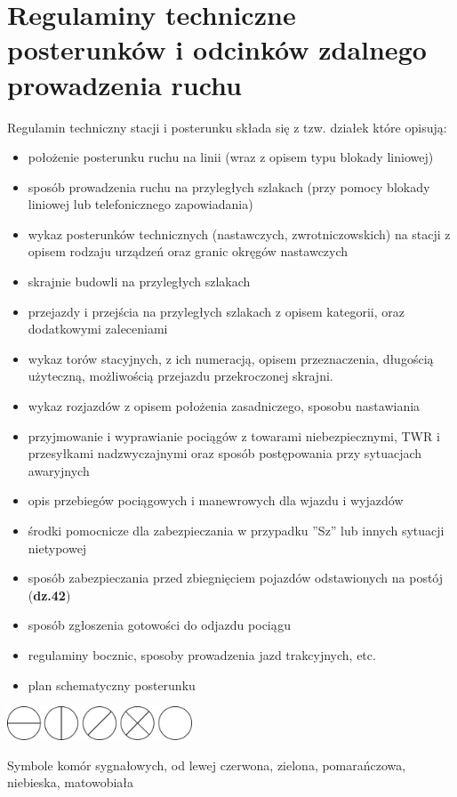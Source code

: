 \chapter{Regulaminy techniczne posterunków i odcinków zdalnego prowadzenia ruchu}

Regulamin techniczny stacji i posterunku składa się z tzw. działek które opisują:
\begin{itemize}
	\item położenie posterunku ruchu na linii (wraz z opisem typu blokady liniowej)
	\item sposób prowadzenia ruchu na przyległych szlakach (przy pomocy blokady liniowej lub telefonicznego zapowiadania)
	\item wykaz posterunków technicznych (nastawczych, zwrotniczowskich) na stacji z opisem rodzaju urządzeń oraz granic okręgów nastawczych
	\item skrajnie budowli na przyległych szlakach
	\item przejazdy i przejścia na przyległych szlakach z opisem kategorii, oraz dodatkowymi zaleceniami
	\item wykaz torów stacyjnych, z ich numeracją, opisem przeznaczenia, długością użyteczną, możliwością przejazdu przekroczonej skrajni.
	\item wykaz rozjazdów z opisem położenia zasadniczego, sposobu nastawiania
	\item przyjmowanie i wyprawianie pociągów z towarami niebezpiecznymi, TWR i przesyłkami nadzwyczajnymi oraz sposób postępowania przy sytuacjach awaryjnych
	\item opis przebiegów pociągowych i manewrowych dla wjazdu i wyjazdów
	\item środki pomocnicze dla zabezpieczania w przypadku ''Sz'' lub innych sytuacji nietypowej
	\item sposób zabezpieczania przed zbiegnięciem pojazdów odstawionych na postój (\textbf{dz.42})
	\item sposób zgłoszenia gotowości do odjazdu pociągu
	\item regulaminy bocznic, sposoby prowadzenia jazd trakcyjnych, etc.
	\item plan schematyczny posterunku
\end{itemize}
	\begin{marginfigure}
	\includegraphics[width=5.5cm]{skryptkierownik-img/komory_sygnalowe_pl.png}
	\caption{Symbole komór sygnałowych, od lewej czerwona, zielona, pomarańczowa, niebieska, matowobiała}
\end{marginfigure}

